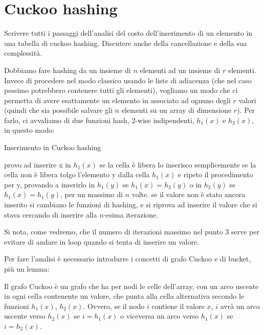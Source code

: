 \chapter {Cuckoo hashing}

\begin{problem*}
    Scrivere tutti i passaggi dell'analisi del costo dell'inserimento
    di un elemento in una tabella di cuckoo hashing. Discutere anche
    della cancellazione e della sua complessità.
\end{problem*}

Dobbiamo fare hashing da un insieme di $n$ elementi ad un insieme di $r$
elementi. Invece di procedere nel modo classico usando le liste di adiacenza
(che nel caso pessimo potrebbero contenere tutti gli elementi), vogliamo un
modo che ci permetta di avere esattamente un elemento in associato ad ognuno
degli $r$ valori (quindi che sia possibile salvare gli $n$ elementi su un array
di dimensione $r$).
Per farlo, ci avvaliamo di due funzioni hash, 2-wise indipendenti, $h_1(x)$ e
$h_2(x)$, in questo modo:

\begin{algorithm}
    \caption{Inserimento in Cuckoo hashing}
    \begin{algorithmic}[1]
        \State provo ad inserire x in $h_1(x)$
        \State se la cella è libera lo inserisco semplicemente
        \State se la cella non è libera tolgo l'elemento y dalla cella $h_1(x)$
        e ripeto il procedimento per y, provando a inserirlo in $h_1(y)$ se
        $h_1(x) = h_2(y)$ o in $h_2(y)$ se $h_1(x) = h_1(y)$, per un massimo di
        $n$ volte.
        \State se il valore non è stato ancora inserito si cambiano le funzioni
        di hashing, e si riprova ad inserire il valore che si stava cercando di
        inserire alla $n$-esima iterazione.
    \end{algorithmic}
\end{algorithm}

Si nota, come vedremo, che il numero di iterazioni massimo nel punto 3 serve
per evitare di andare in loop quando si tenta di inserire un valore.

Per fare l'analisi è necessario introdurre i concetti di grafo Cuckoo e di
bucket, più un lemma:

\begin{definition*}
    Il grafo Cuckoo è un grafo che ha per nodi le celle dell'array, con un arco
    uscente in ogni cella contenente un valore, che punta alla cella alternativa
    secondo le funzioni $h_1(x)$, $h_2(x)$. Ovvero, se il nodo $i$ contiene il
    valore $x$, $i$ avrà un arco uscente verso $h_2(x)$ se $i = h_1(x)$ o
    viceversa un arco verso $h_1(x)$ se $i = h_2(x)$.
\end{definition*}


